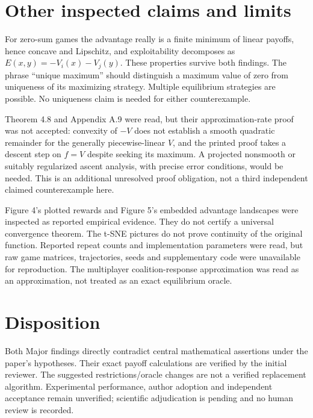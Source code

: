 \documentclass[10pt]{article}
\begin{document}
\section*{Other inspected claims and limits}
For zero-sum games the advantage really is a finite minimum of linear payoffs, hence concave and Lipschitz, and exploitability decomposes as \(E(x,y)=-V_i(x)-V_j(y)\). These properties survive both findings. The phrase “unique maximum” should distinguish a maximum value of zero from uniqueness of its maximizing strategy. Multiple equilibrium strategies are possible. No uniqueness claim is needed for either counterexample.\par
Theorem 4.8 and Appendix A.9 were read, but their approximation-rate proof was not accepted: convexity of \(-V\) does not establish a smooth quadratic remainder for the generally piecewise-linear \(V\), and the printed proof takes a descent step on \(f=V\) despite seeking its maximum. A projected nonsmooth or suitably regularized ascent analysis, with precise error conditions, would be needed. This is an additional unresolved proof obligation, not a third independent claimed counterexample here.\par
Figure 4’s plotted rewards and Figure 5’s embedded advantage landscapes were inspected as reported empirical evidence. They do not certify a universal convergence theorem. The t-SNE pictures do not prove continuity of the original function. Reported repeat counts and implementation parameters were read, but raw game matrices, trajectories, seeds and supplementary code were unavailable for reproduction. The multiplayer coalition-response approximation was read as an approximation, not treated as an exact equilibrium oracle.\par
\section*{Disposition}
Both Major findings directly contradict central mathematical assertions under the paper’s hypotheses. Their exact payoff calculations are verified by the initial reviewer. The suggested restrictions/oracle changes are not a verified replacement algorithm. Experimental performance, author adoption and independent acceptance remain unverified; scientific adjudication is pending and no human review is recorded.\par
\end{document}
